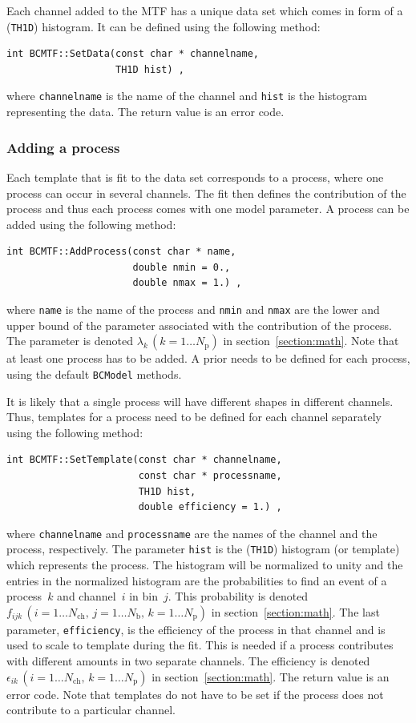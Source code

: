 \documentclass[11pt, a4paper]{article}
\begin{document}
Each channel added to the MTF has a unique data set which comes in
form of a (\verb|TH1D|) histogram. It can be defined using the
following method:
%
\begin{verbatim}
int BCMTF::SetData(const char * channelname,
                   TH1D hist) ,
\end{verbatim}
%
where \verb|channelname| is the name of the channel and \verb|hist| is
the histogram representing the data. The return value is an error
code.

\subsubsection{Adding a process}

Each template that is fit to the data set corresponds to a process,
where one process can occur in several channels. The fit then defines
the contribution of the process and thus each process comes with one
model parameter. A process can be added using the following method:
%
\begin{verbatim}
int BCMTF::AddProcess(const char * name,
                      double nmin = 0.,
                      double nmax = 1.) ,
\end{verbatim}
%
where \verb|name| is the name of the process and \verb|nmin| and
\verb|nmax| are the lower and upper bound of the parameter associated
with the contribution of the process. The parameter is denoted
$\lambda_{k} \, (k=1\dots N_{\mathrm{p}})$ in
section~\ref{section:math}. Note that at least one process has to be
added. A prior needs to be defined for each process, using the default
\verb|BCModel| methods.

It is likely that a single process will have different shapes in
different channels. Thus, templates for a process need to be defined
for each channel separately using the following method:
%
\begin{verbatim}
int BCMTF::SetTemplate(const char * channelname,
                       const char * processname,
                       TH1D hist,
                       double efficiency = 1.) ,
\end{verbatim}
%
where \verb|channelname| and \verb|processname| are the names of the
channel and the process, respectively. The parameter \verb|hist| is
the (\verb|TH1D|) histogram (or template) which represents the
process. The histogram will be normalized to unity and the entries in
the normalized histogram are the probabilities to find an event of a
process~$k$ and channel~$i$ in bin~$j$. This probability is denoted
$f_{ijk}\,(i=1\dots N_{\mathrm{ch}}, \, j=1\dots N_{\mathrm{b}}, \,
k=1\dots N_{\mathrm{p}})$ in section~\ref{section:math}. The last
parameter, \verb|efficiency|, is the efficiency of the process in that
channel and is used to scale to template during the fit. This is
needed if a process contributes with different amounts in two separate
channels. The efficiency is denoted $\epsilon_{ik} \, (i=1\dots
N_{\mathrm{ch}}, \, k=1\dots N_{\mathrm{p}})$ in
section~\ref{section:math}. The return value is an error code. Note
that templates do not have to be set if the process does not
contribute to a particular channel.
\end{document}
